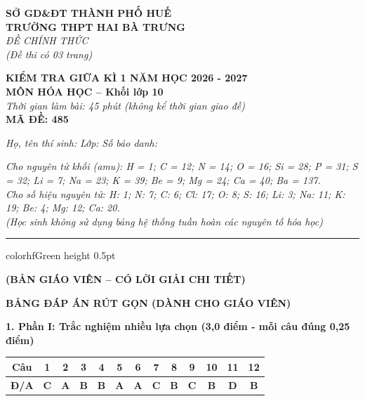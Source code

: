 \documentclass[11pt,a4paper]{article}
\begin{document}
\begin{minipage}[t]{0.48\textwidth}
\textbf{SỞ GD\&ĐT THÀNH PHỐ HUẾ}\\
\textbf{TRƯỜNG THPT HAI BÀ TRƯNG}\\
\textit{ĐỀ CHÍNH THỨC}\\
\textit{(Đề thi có 03 trang)}
\end{minipage}
\hfill
\begin{minipage}[t]{0.48\textwidth}
\raggedleft
\textbf{\color{hfRed}KIỂM TRA GIỮA KÌ 1 NĂM HỌC 2026 - 2027}\\
\textbf{MÔN HÓA HỌC -- Khối lớp 10}\\
\textit{Thời gian làm bài: 45 phút (không kể thời gian giao đề)}\\
\textbf{MÃ ĐỀ: 485}
\end{minipage}

\vspace{4pt}
\noindent
\textit{Họ, tên thí sinh:} \dotfill \textit{Lớp:} \dotfill \textit{Số báo danh:} \dotfill

\vspace{3pt}
\noindent
\textit{\footnotesize Cho nguyên tử khối (amu): H = 1; C = 12; N = 14; O = 16; Si = 28; P = 31; S = 32; Li = 7; Na = 23; K = 39; Be = 9; Mg = 24; Ca = 40; Ba = 137.\\
Cho số hiệu nguyên tử: H: 1; N: 7; C: 6; Cl: 17; O: 8; S: 16; Li: 3; Na: 11; K: 19; Be: 4; Mg: 12; Ca: 20.\\
(Học sinh không sử dụng bảng hệ thống tuần hoàn các nguyên tố hóa học)}

\vspace{3pt}
\hrule color{hfGreen} height 0.5pt

\vspace{4pt}
\begin{center}
\textbf{\color{hfRed}\large (BẢN GIÁO VIÊN -- CÓ LỜI GIẢI CHI TIẾT)}
\end{center}

\vspace{2pt}
\begin{center}
{\color{hfRed}\textbf{\large BẢNG ĐÁP ÁN RÚT GỌN (DÀNH CHO GIÁO VIÊN)}}
\end{center}

\vspace{2pt}
\noindent
\textbf{\color{mainGreen}1. Phần I: Trắc nghiệm nhiều lựa chọn (3,0 điểm - mỗi câu đúng 0,25 điểm)}
\begin{center}
\renewcommand{\arraystretch}{1.2}
\begin{tabular}{|c|c|c|c|c|c|c|c|c|c|c|c|c|}
\hline
\rowcolor{tableGreen}
\textbf{Câu} & \textbf{1} & \textbf{2} & \textbf{3} & \textbf{4} & \textbf{5} & \textbf{6} & \textbf{7} & \textbf{8} & \textbf{9} & \textbf{10} & \textbf{11} & \textbf{12} \\
\hline
\textbf{Đ/A} & \textbf{\color{hfRed}C} & \textbf{\color{hfRed}A} & \textbf{\color{hfRed}B} & \textbf{\color{hfRed}B} & \textbf{\color{hfRed}A} & \textbf{\color{hfRed}A} & \textbf{\color{hfRed}C} & \textbf{\color{hfRed}B} & \textbf{\color{hfRed}C} & \textbf{\color{hfRed}B} & \textbf{\color{hfRed}D} & \textbf{\color{hfRed}B} \\
\hline
\end{tabular}
\end{center}
\end{document}
